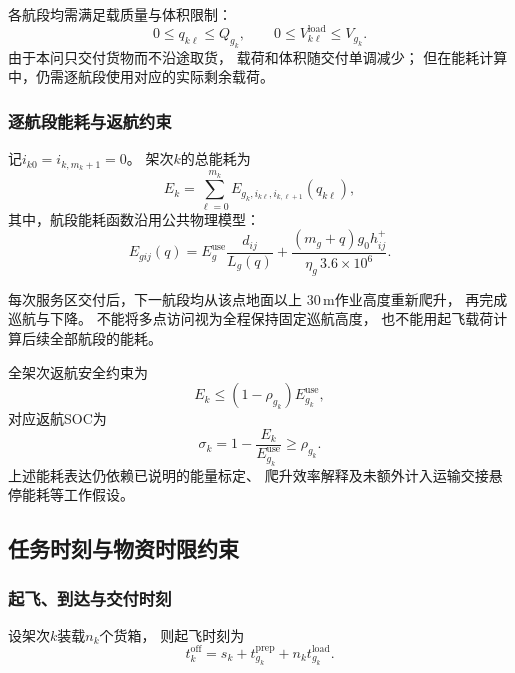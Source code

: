 \documentclass[bwprint]{gmcmthesis}
\begin{document}
各航段均需满足载质量与体积限制：
\begin{equation}
    0\leq q_{k\ell}\leq Q_{g_k},
    \qquad
    0\leq V_{k\ell}^{\mathrm{load}}\leq V_{g_k}.
\end{equation}
由于本问只交付货物而不沿途取货，
载荷和体积随交付单调减少；
但在能耗计算中，仍需逐航段使用对应的实际剩余载荷。

\subsubsection{逐航段能耗与返航约束}

记$i_{k0}=i_{k,m_k+1}=0$。
架次$k$的总能耗为
\begin{equation}
    E_k
    =
    \sum_{\ell=0}^{m_k}
    E_{g_k,i_{k\ell},i_{k,\ell+1}}(q_{k\ell}),
    \label{eq:q2_sortie_energy}
\end{equation}
其中，航段能耗函数沿用公共物理模型：
\begin{equation}
    E_{gij}(q)
    =
    E_g^{\mathrm{use}}\frac{d_{ij}}{L_g(q)}
    +
    \frac{(m_g+q)g_0h_{ij}^{+}}
    {\eta_g\,3.6\times10^6}.
\end{equation}

每次服务区交付后，下一航段均从该点地面以上
$30\,\mathrm{m}$作业高度重新爬升，
再完成巡航与下降。
不能将多点访问视为全程保持固定巡航高度，
也不能用起飞载荷计算后续全部航段的能耗。

全架次返航安全约束为
\begin{equation}
    E_k
    \leq
    (1-\rho_{g_k})E_{g_k}^{\mathrm{use}},
\end{equation}
对应返航SOC为
\begin{equation}
    \sigma_k
    =
    1-\frac{E_k}{E_{g_k}^{\mathrm{use}}}
    \geq \rho_{g_k}.
\end{equation}
上述能耗表达仍依赖已说明的能量标定、
爬升效率解释及未额外计入运输交接悬停能耗等工作假设。

\subsection{任务时刻与物资时限约束}

\subsubsection{起飞、到达与交付时刻}

设架次$k$装载$n_k$个货箱，
则起飞时刻为
\begin{equation}
    t_k^{\mathrm{off}}
    =
    s_k+t_{g_k}^{\mathrm{prep}}
    +n_k t_{g_k}^{\mathrm{load}}.
\end{equation}
\end{document}
